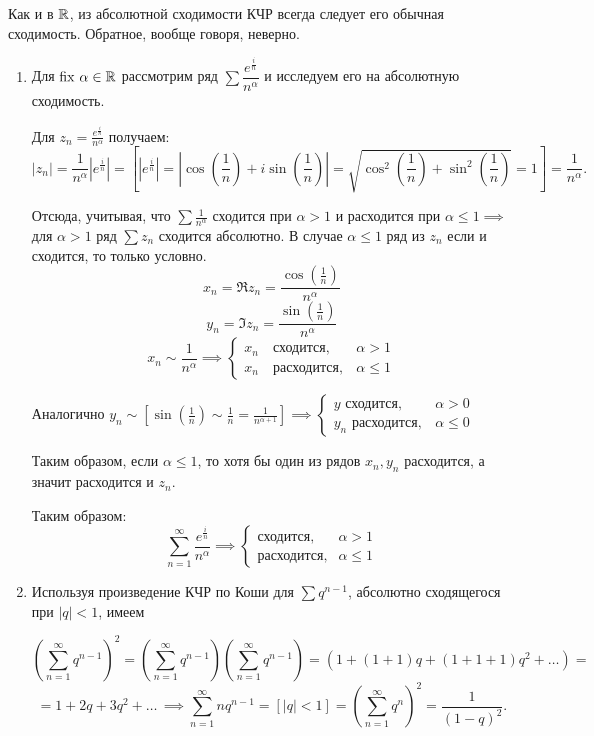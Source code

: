 \documentclass[../../main.tex]{subfiles}
\begin{document}
\begin{rem}
	Как и в $ \mathbb{R} $, из абсолютной сходимости КЧР всегда следует его обычная 
	сходимость. Обратное, вообще говоря, неверно.
\end{rem}

\begin{exmp}
	\;
	\begin{enumerate}
		\item Для $ \operatorname{fix}\, \alpha \in \mathbb{R} $ рассмотрим ряд $ \sum 
		\dfrac{e^{\frac{i}{n}}}{n^\alpha} $ и исследуем его на абсолютную сходимость.
		
		Для $ z_n = \frac{e^{\frac{i}{n}}}{n^\alpha}$ получаем: \[|z_n| = 
		\frac{1}{n^\alpha} |e^{\frac{i}{n}}| = \left[|e^{\frac{i}{n}}| = 
		\left|\cos\left(\frac{1}{n}\right) + i\sin\left(\frac{1}{n}\right)\right| = 
		\sqrt{\cos^2\left(\frac{1}{n}\right) + 
		\sin^2\left(\frac{1}{n}\right)} = 1\right] = \frac{1}{n^\alpha}.\]
		
		Отсюда, учитывая, что $ \sum \frac{1}{n^\alpha} $ сходится при $ \alpha > 1 
		$ и расходится при $ \alpha \leq 1 \implies $ для $ \alpha > 1 $ ряд $
		\sum z_n $ сходится абсолютно. В случае $ \alpha \leq 1 $ ряд из $ z_n $ 
		если и сходится, то только условно.
		\[x_n = \Re z_n = \frac{\cos(\frac{1}{n})}{n^\alpha}\]
		\[y_n = \Im z_n = \frac{\sin(\frac{1}{n})}{n^\alpha}\]
		\[x_n \sim \frac{1}{n^\alpha} \implies 
		\begin{cases}
			x_n \quad \text{сходится}, &\alpha > 1 \\
			x_n \quad \text{расходится}, &\alpha \leq 1
		\end{cases}\]
		
		Аналогично $\displaystyle y_n \sim \left[\sin\left(\frac{1}{n}\right) \sim 
		\frac{1}{n} = 
		\frac{1}{n^{\alpha + 1}}\right] \implies
		\begin{cases}
		y  \text{ сходится},& \alpha > 0 \\
		y_n  \text{ расходится},& \alpha \leq 0
		\end{cases} $
		
		Таким образом, если $ \alpha \leq 1 $, то хотя бы один из рядов $ x_n, y_n $ 
		расходится, а значит расходится и $ z_n $.
		
		Таким образом:
		\[ \sum_{n=1}^{\infty}\frac{e^{\frac{i}{n}}}{n^\alpha}\implies
		\begin{cases}
		\text{сходится},& \alpha > 1 \\
		\text{расходится},& \alpha \leq 1
		\end{cases}\]
		
	\item Используя произведение КЧР по Коши для $ \sum q^{n - 1} $, абсолютно 
	сходящегося при ${|q| < 1}$, имеем
	
	\[\left(\sum_{n=1}^{\infty}q^{n - 1}\right)^2 = \left(\sum_{n=1}^{\infty}q^{n 
	- 
	1}\right)\left(\sum_{n=1}^{\infty}q^{n - 1}\right) = (1 + (1 + 1)q + (1 + 1 + 
	1)q^2 + \ldots ) = \]
	\[= 1 + 2q + 3q^2 + \ldots\, \implies
	\sum_{n=1}^{\infty}nq^{n - 1} = [|q| < 1] = 
	\left(\sum_{n=1}^{\infty}q^{n}\right)^2 = 
	\frac{1}{(1 - q)^2}.\]
	\end{enumerate}
\end{exmp}
\end{document}
